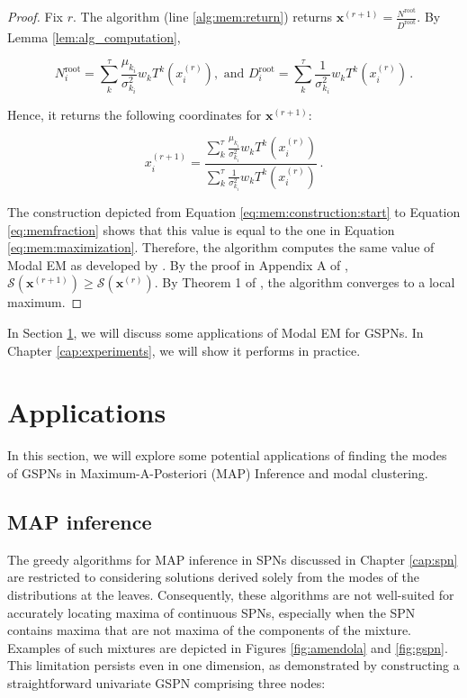 \begin{proof}
  Fix $r$. The algorithm (line \ref{alg:mem:return}) returns $\mathbf{x}^{(r+1)} = \frac{N^\text{root}}{D^\text{root}}$. By Lemma \ref{lem:alg_computation},

  \begin{equation}
    N^\text{root}_i = \sum_k^{\tau} \frac{\mu_{k_i}}{\sigma_{k_i}^2} w_k T^k\left(x^{(r)}_i\right), \text{ and }
    D^\text{root}_i = \sum_k^{\tau} \frac{1}{\sigma_{k_i}^2} w_k T^k\left(x^{(r)}_i\right) \, .
  \end{equation}

  \noindent Hence, it returns the following coordinates for $\mathbf{x}^{(r+1)}$:

  \begin{equation}
    x_i^{(r+1)} = \frac{\sum_k^{\tau} \frac{\mu_{k_i}}{\sigma_{k_i}^2} w_k T^k\left(x^{(r)}_i\right)}{\sum_k^{\tau} \frac{1}{\sigma_{k_i}^2} w_k T^k\left(x^{(r)}_i\right)} \, .
  \end{equation}

  The construction depicted from Equation \ref{eq:mem:construction:start} to Equation \ref{eq:memfraction} shows that this value is equal to the one in Equation \ref{eq:mem:maximization}. Therefore, the algorithm computes the same value of Modal EM as developed by \citet{Li2007}. By the proof in Appendix A of \citep{Li2007}, $\mathcal{S}\left(\mathbf{x}^{(r+1)}\right) \geq \mathcal{S}\left(\mathbf{x}^{(r)}\right)$. By Theorem 1 of \citep{Wu1983}, the algorithm converges to a local maximum.
\end{proof}

In Section \ref{sec:algorithm:applications}, we will discuss some applications of Modal EM for GSPNs. In Chapter \ref{cap:experiments}, we will show it performs in practice.

\section{Applications}
\label{sec:algorithm:applications}

In this section, we will explore some potential applications of finding the modes of GSPNs in Maximum-A-Posteriori (MAP) Inference and modal clustering.

\subsection{MAP inference}

The greedy algorithms for MAP inference in SPNs discussed in Chapter \ref{cap:spn} are restricted to considering solutions derived solely from the modes of the distributions at the leaves. Consequently, these algorithms are not well-suited for accurately locating maxima of continuous SPNs, especially when the SPN contains maxima that are not maxima of the components of the mixture. Examples of such mixtures are depicted in Figures \ref{fig:amendola} and \ref{fig:gspn}. This limitation persists even in one dimension, as demonstrated by constructing a straightforward univariate GSPN comprising three nodes:

